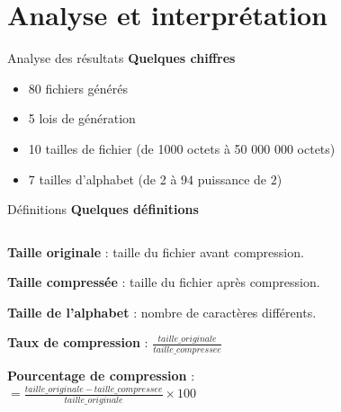 \documentclass{beamer}
\begin{document}
\section{Analyse et interprétation}
\begin{frame}{Analyse des résultats}
    \centering
    \large\textbf{Quelques chiffres}

    \vspace{20pt}
    \begin{itemize}
        \item 80 fichiers générés
        \item 5 lois de génération
        \item 10 tailles de fichier (de 1000 octets à 50 000 000 octets)
        \item 7 tailles d'alphabet (de 2 à $94$ puissance de $2$)
    \end{itemize}
\end{frame}

\begin{frame}{Définitions}
    \centering
    \large\textbf{Quelques définitions}
    \vspace{10pt}
    \begin{columns}[T]
        \begin{column}{0.9\textwidth}
            \begin{flushleft}
                \textbf{Taille originale} : taille du fichier avant compression. \\
                \vspace{10pt}

                \textbf{Taille compressée} : taille du fichier après compression. \\
                \vspace{10pt}

                \textbf{Taille de l'alphabet} : nombre de caractères différents. \\
                \vspace{10pt}

                \textbf{Taux de compression} : $\frac{taille\_originale}{taille\_compressee}$ \\
                \vspace{10pt}

                \textbf{Pourcentage de compression} : \\

                \centering
                $ = \frac{taille\_originale - taille\_compressee}{taille\_originale} \times 100$ \\
            \end{flushleft}
        \end{column}
    \end{columns}
\end{frame}
\end{document}
